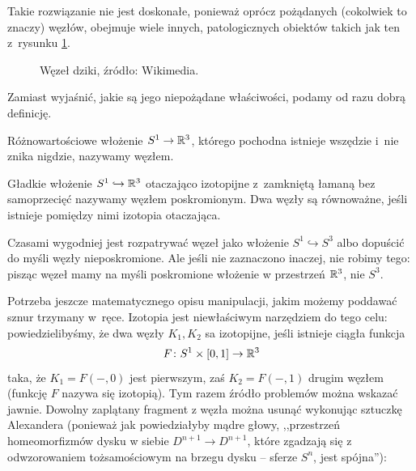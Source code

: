 Takie rozwiązanie nie jest doskonałe, ponieważ oprócz pożądanych (cokolwiek to znaczy) węzłów, obejmuje wiele innych, patologicznych obiektów takich jak ten z~rysunku \ref{fig_wild_knot}.

\begin{figure}[H]
    \centering

    \caption[caption-wild-knot]{Węzeł dziki, źródło: Wikimedia{\footnotemark}.}
%
\label{fig_wild_knot}%
\end{figure}

Zamiast wyjaśnić, jakie są jego niepożądane właściwości, podamy od razu dobrą definicję.

\begin{definition}[węzeł]
    Różnowartościowe włożenie $S^1 \to \mathbb R^3$, którego pochodna istnieje wszędzie i~nie znika nigdzie, nazywamy węzłem.
\end{definition}

\begin{definition}[węzeł]
%
\label{def:knot}%
    Gładkie włożenie $S^1 \hookrightarrow \mathbb R^3$ otaczająco izotopijne z~zamkniętą łamaną bez samoprzecięć nazywamy węzłem poskromionym.
    Dwa węzły są równoważne, jeśli istnieje pomiędzy nimi izotopia otaczająca.
\end{definition}

Czasami wygodniej jest rozpatrywać węzeł jako włożenie $S^1 \hookrightarrow S^3$ albo dopuścić do myśli węzły nieposkromione.
Ale jeśli nie zaznaczono inaczej, nie robimy tego: pisząc węzeł mamy na myśli poskromione włożenie w przestrzeń $\mathbb R^3$, nie $S^3$.

Potrzeba jeszcze matematycznego opisu manipulacji, jakim możemy poddawać sznur trzymany w~ręce.
Izotopia jest niewłaściwym narzędziem do tego celu: powiedzielibyśmy, że dwa węzły $K_1, K_2$ sa izotopijne, jeśli istnieje ciągła funkcja
\begin{equation}
    F \colon S^1 \times [0, 1] \to \mathbb R^3
\end{equation}
taka, że $K_1 = F(-, 0)$ jest pierwszym, zaś $K_2 = F(-,1)$ drugim węzłem (funkcję $F$ nazywa się izotopią).
Tym razem źródło problemów można wskazać jawnie.
Dowolny zaplątany fragment z węzła można usunąć wykonując sztuczkę Alexandera (ponieważ jak powiedziałyby mądre głowy, ,,przestrzeń homeomorfizmów dysku w siebie $D^{n+1} \to D^{n+1}$, które zgadzają się z odwzorowaniem tożsamościowym na brzegu dysku -- sferze $S^n$, jest spójna''):
%
%

